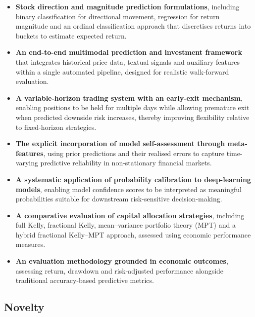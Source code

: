 \documentclass{l4proj}
\begin{document}
\begin{itemize}
    \item 
    \textbf{Stock direction and magnitude prediction formulations}, including binary classification for directional movement, regression for return magnitude and an ordinal classification approach that discretises returns into buckets to estimate expected return.

    \item 
    \textbf{An end-to-end multimodal prediction and investment framework} that integrates historical price data, textual signals and auxiliary features within a single automated pipeline, designed for realistic walk-forward evaluation.

    \item 
    \textbf{A variable-horizon trading system with an early-exit mechanism}, enabling positions to be held for multiple days while allowing premature exit when predicted downside risk increases, thereby improving flexibility relative to fixed-horizon strategies.

    \item 
    \textbf{The explicit incorporation of model self-assessment through meta-features}, using prior predictions and their realised errors to capture time-varying predictive reliability in non-stationary financial markets.

    \item 
    \textbf{A systematic application of probability calibration to deep-learning models}, enabling model confidence scores to be interpreted as meaningful probabilities suitable for downstream risk-sensitive decision-making.

    \item 
    \textbf{A comparative evaluation of capital allocation strategies}, including full Kelly, fractional Kelly, mean--variance portfolio theory (MPT) and a hybrid fractional Kelly--MPT approach, assessed using economic performance measures.

    \item 
    \textbf{An evaluation methodology grounded in economic outcomes}, assessing return, drawdown and risk-adjusted performance alongside traditional accuracy-based predictive metrics.
\end{itemize}

\subsection{Novelty}
\end{document}
